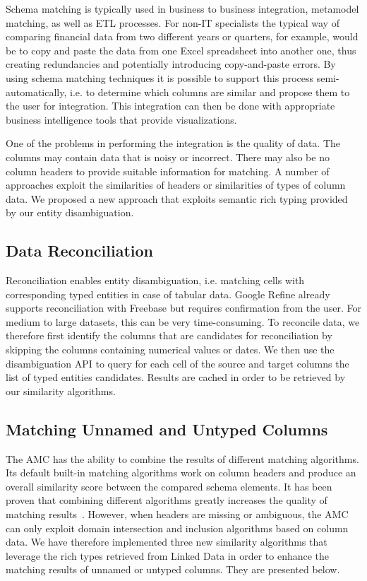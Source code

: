 \documentclass[a4paper,11pt,twoside]{ThesisStyle}
\begin{document}
Schema matching is typically used in business to business integration, metamodel matching, as well as ETL processes. For non-IT specialists the typical way of comparing financial data from two different years or quarters, for example, would be to copy and paste the data from one Excel spreadsheet into another one, thus creating redundancies and potentially introducing copy-and-paste errors. By using schema matching techniques it is possible to support this process semi-automatically, i.e. to determine which columns are similar and propose them to the user for integration. This integration can then be done with appropriate business intelligence tools that provide visualizations.

One of the problems in performing the integration is the quality of data. The columns may contain data that is noisy or incorrect. There may also be no column headers to provide suitable information for matching. A number of approaches exploit the similarities of headers or similarities of types of column data. We proposed a new approach that exploits semantic rich typing provided by our entity disambiguation.

\subsection{Data Reconciliation}
Reconciliation enables entity disambiguation, i.e. matching cells with corresponding typed entities in case of tabular data. Google Refine already supports reconciliation with Freebase but requires confirmation from the user. For medium to large datasets, this can be very time-consuming. To reconcile data, we therefore first identify the columns that are candidates for reconciliation by skipping the columns containing numerical values or dates. We then use the disambiguation API to query for each cell of the source and target columns the list of typed entities candidates. Results are cached in order to be retrieved by our similarity algorithms.

\subsection{Matching Unnamed and Untyped Columns}
The AMC has the ability to combine the results of different matching algorithms. Its default built-in matching algorithms work on column headers and produce an overall similarity score between the compared schema elements. It has been proven that combining different algorithms greatly increases the quality of matching results~\cite{Peukert:ICDE:12}\cite{conf/wise/StracciaT05}. However, when headers are missing or ambiguous, the AMC can only exploit domain intersection and inclusion algorithms based on column data. We have therefore implemented three new similarity algorithms that leverage the rich types retrieved from Linked Data in order to enhance the matching results of unnamed or untyped columns. They are presented below.
\end{document}
